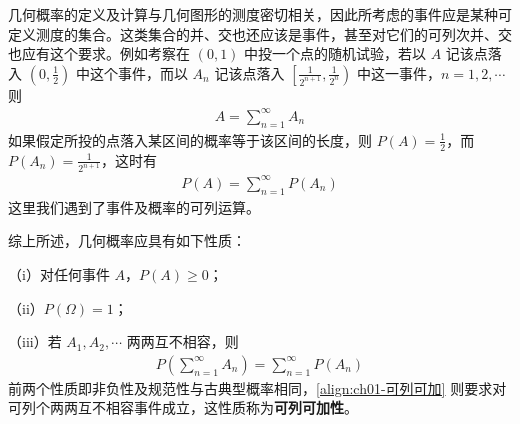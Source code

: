 \documentclass[../../main.tex]{subfiles}
\begin{document}
几何概率的定义及计算与几何图形的测度密切相关，因此所考虑的事件应是某种可定义测度的集合。这类集合的并、交也还应该是事件，甚至对它们的可列次并、交也应有这个要求。例如考察在 $(0,1)$ 中投一个点的随机试验，若以 $A$ 记该点落入 $\left(0,\frac{1}{2}\right)$ 中这个事件，而以 $A_n$ 记该点落入 $\left[\frac{1}{2^{n+1}},\frac{1}{2^n}\right)$ 中这一事件，$n=1,2,\cdots$ 则
\begin{align*}
A=\sum_{n=1}^{\infty}A_n
\end{align*}
如果假定所投的点落入某区间的概率等于该区间的长度，则 $P(A)=\frac{1}{2}$，而 $P(A_n)=\frac{1}{2^{n+1}}$，这时有
\begin{align*}
P(A)=\sum_{n=1}^{\infty}P(A_n)
\end{align*}
这里我们遇到了事件及概率的可列运算。

综上所述，几何概率应具有如下性质：

（i）对任何事件 $A$，$P(A)\geqslant 0$；

（ii）$P(\Omega)=1$；

（iii）若 $A_1,A_2,\cdots$ 两两互不相容，则
\begin{align}
P\left(\sum_{n=1}^{\infty}A_n\right)=\sum_{n=1}^{\infty}P(A_n)\label{align:ch01-可列可加}
\end{align}
前两个性质即非负性及规范性与古典型概率相同，\eqref{align:ch01-可列可加} 则要求对可列个两两互不相容事件成立，这性质称为\textbf{可列可加性}。
\end{document}
